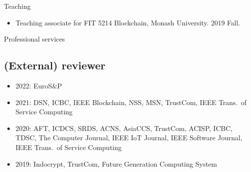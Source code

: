 \documentclass{resume} %
\begin{document}
\begin{rSection}{Teaching}
    \begin{itemize}
        \item Teaching associate for FIT 5214 Blockchain, Monash University. 2019 Fall.
    \end{itemize}
\end{rSection}


\begin{rSection}{Professional services}
    \subsection*{(External) reviewer}
    \begin{itemize}
        \item 2022: EuroS\&P
        \item 2021: DSN, ICBC, IEEE Blockchain, NSS, MSN, TrustCom, IEEE Trans.\ of Service Computing
        \item 2020: AFT, ICDCS, SRDS, ACNS, AsiaCCS, TrustCom, ACISP, ICBC, TDSC, The Computer Journal, IEEE IoT Journal, IEEE Software Journal, IEEE Trans.\ of Service Computing
        \item 2019: Indocrypt, TrustCom, Future Generation Computing System
    \end{itemize}
\end{rSection}




\end{document}
